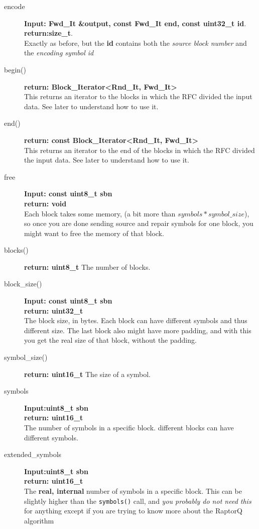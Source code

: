\documentclass[11pt,a4paper]{refart}
\begin{document}
\begin{description}
\item[encode] \textbf{Input: Fwd\_It \&output, const Fwd\_It end, const uint32\_t id}.\\
\textbf{return:size\_t}.\\
Exactly as before, but the \textbf{id} contains both the \textit{source block number} and the \textit{encoding symbol id}

\item[begin()] \textbf{return: Block\_Iterator<Rnd\_It, Fwd\_It>}\\
This returns an iterator to the blocks in which the RFC divided the input data. See later to understand how to use it.
\item[end()] \textbf{return: const Block\_Iterator<Rnd\_It, Fwd\_It>}\\
This returns an iterator to the end of the blocks in which the RFC divided the input data. See later to understand how to use it.

\item [free] \textbf{Input: const uint8\_t sbn}\\
\textbf{return: void}\\
Each block takes some memory, (a bit more than $symbols * symbol\_size$), so once you are done sending source and repair symbols for one block,
you might want to free the memory of that block.

\item[blocks()] \textbf{return: uint8\_t} The number of blocks.

\item[block\_size()] \textbf{Input: const uint8\_t sbn}\\
\textbf{return: uint32\_t}\\
The block size, in bytes. Each block can have different symbols and thus different size. The last block also might have more padding, and with this you get the real size of that block, without the padding.

\item[symbol\_size()] \textbf{return: uint16\_t} The size of a symbol.

\item[symbols] \textbf{Input:uint8\_t sbn}\\
\textbf{return: uint16\_t}\\
The number of symbols in a specific block. different blocks can have different symbols.

\item[extended\_symbols] \textbf{Input:uint8\_t sbn}\\
\textbf{return: uint16\_t}\\
The \textbf{real, internal} number of symbols in a specific block. This can be slightly higher than the \texttt{symbols()} call, and \textit{you probably do not need this} for anything except if you are trying to know more about the RaptorQ algorithm


\end{description}
\end{document}

